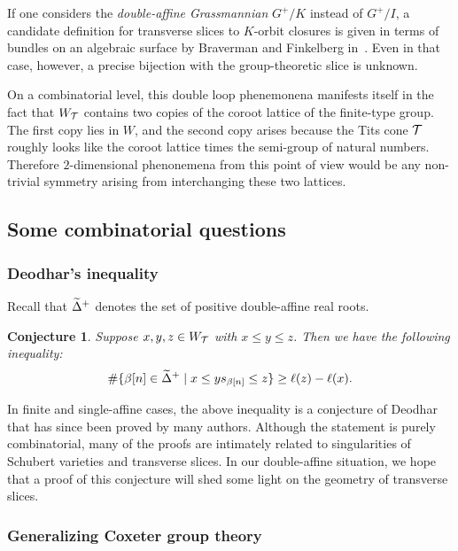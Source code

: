 \documentclass[10pt]{amsart}
\newtheorem{conj}[theo]{Conjecture}
\begin{document}
If one considers the \emph{double-affine Grassmannian} $G^+/K$ instead of $G^+/I$, a candidate definition for transverse slices to $K$-orbit closures is given in terms of bundles on an algebraic surface by Braverman and Finkelberg in~\cite{BF}. Even in that case, however, a precise bijection with the group-theoretic slice is unknown.

On a combinatorial level, this double loop phenemonena manifests itself in the fact that $W_{\mathcal{T}}$ contains two copies of the coroot lattice of the finite-type group. The first copy lies in $W$, and the second copy arises because the Tits cone $\mathcal{T}$ roughly looks like the coroot lattice times the semi-group of natural numbers. Therefore $2$-dimensional phenonemena from this point of view would be any non-trivial symmetry arising from interchanging these two lattices.

\subsection{Some combinatorial questions}

\subsubsection{Deodhar's inequality}

Recall that $\widetilde{\Delta}^+$ denotes the set of positive double-affine real roots.

\begin{conj}
Suppose $x,y,z \in W_{\mathcal{T}}$ with $x \leq y \leq z$. Then we have the following inequality:
\begin{equation}\label{eq:30}
\# \{ \beta[n] \in \tDelta^+ \suchthat x \leq y s_{\beta[n]} \leq z \} \geq \ell(z) - \ell(x).
\end{equation}
\end{conj}

In finite and single-affine cases, the above inequality is a conjecture of Deodhar that has since been proved by many authors. Although the statement is purely combinatorial, many of the proofs are intimately related to singularities of Schubert varieties and transverse slices. In our double-affine situation, we hope that a proof of this conjecture will shed some light on the geometry of transverse slices.

\subsubsection{Generalizing Coxeter group theory}
\end{document}

